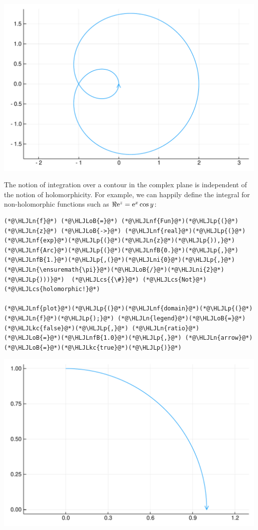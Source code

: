 \documentclass[12pt,a4paper]{article}
\newcommand{\HLJLkc}[1]{\textcolor[RGB]{59,151,46}{\textit{#1}}}
\newcommand{\HLJLn}[1]{#1}
\newcommand{\HLJLnf}[1]{\textcolor[RGB]{66,102,213}{#1}}
\newcommand{\HLJLnfB}[1]{\textcolor[RGB]{59,151,46}{#1}}
\newcommand{\HLJLni}[1]{\textcolor[RGB]{59,151,46}{#1}}
\newcommand{\HLJLoB}[1]{\textcolor[RGB]{102,102,102}{\textbf{#1}}}
\newcommand{\HLJLp}[1]{#1}
\newcommand{\HLJLcs}[1]{\textcolor[RGB]{153,153,119}{\textit{#1}}}
\def\E{ {\rm e} }
\begin{document}
\includegraphics[width=\linewidth]{figures/Lecture1_20_1.pdf}

The notion of integration over a contour in the complex plane  is independent of the notion of holomorphicity. For example, we can happily define the integral for non-holomorphic functions such as $\Re \E^z = \E^x \cos y$:


\begin{lstlisting}
(*@\HLJLn{f}@*) (*@\HLJLoB{=}@*) (*@\HLJLnf{Fun}@*)(*@\HLJLp{(}@*) (*@\HLJLn{z}@*) (*@\HLJLoB{->}@*) (*@\HLJLnf{real}@*)(*@\HLJLp{(}@*)(*@\HLJLnf{exp}@*)(*@\HLJLp{(}@*)(*@\HLJLn{z}@*)(*@\HLJLp{)),}@*) (*@\HLJLnf{Arc}@*)(*@\HLJLp{(}@*)(*@\HLJLnfB{0.}@*)(*@\HLJLp{,}@*)(*@\HLJLnfB{1.}@*)(*@\HLJLp{,(}@*)(*@\HLJLni{0}@*)(*@\HLJLp{,}@*)(*@\HLJLn{\ensuremath{\pi}}@*)(*@\HLJLoB{/}@*)(*@\HLJLni{2}@*)(*@\HLJLp{)))}@*)  (*@\HLJLcs{{\#}}@*) (*@\HLJLcs{Not}@*) (*@\HLJLcs{holomorphic!}@*)

(*@\HLJLnf{plot}@*)(*@\HLJLp{(}@*)(*@\HLJLnf{domain}@*)(*@\HLJLp{(}@*)(*@\HLJLn{f}@*)(*@\HLJLp{);}@*) (*@\HLJLn{legend}@*)(*@\HLJLoB{=}@*)(*@\HLJLkc{false}@*)(*@\HLJLp{,}@*) (*@\HLJLn{ratio}@*)(*@\HLJLoB{=}@*)(*@\HLJLnfB{1.0}@*)(*@\HLJLp{,}@*) (*@\HLJLn{arrow}@*)(*@\HLJLoB{=}@*)(*@\HLJLkc{true}@*)(*@\HLJLp{)}@*)
\end{lstlisting}

\includegraphics[width=\linewidth]{figures/Lecture1_21_1.pdf}
\end{document}
